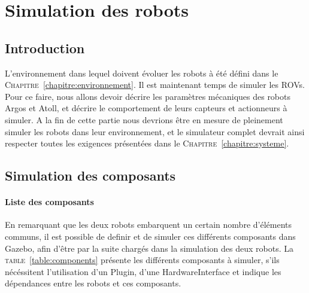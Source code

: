 \chapter{Simulation des robots}
\label{chapitre:robots}
	
	\section{Introduction}

		L'environnement dans lequel doivent évoluer les robots à été défini dans le \textsc{Chapitre}~\ref{chapitre:environnement}. Il est maintenant temps de simuler les \gls{ROV}s. Pour ce faire, nous allons devoir décrire les paramètres mécaniques des robots \gls{Argos} et \gls{Atoll}, et décrire le comportement de leurs capteurs et actionneurs à simuler. A la fin de cette partie nous devrions être en mesure de pleinement simuler les robots dans leur environnement, et le simulateur complet devrait ainsi respecter toutes les exigences présentées dans le \textsc{Chapitre}~\ref{chapitre:systeme}.

	\section{Simulation des composants}

		\subsubsection{Liste des composants}
			En remarquant que les deux robots embarquent un certain nombre d'éléments communs, il est possible de definir et de simuler ces différents composants dans \gls{Gazebo}, afin d'être par la suite chargés dans la simulation des deux robots. La \textsc{table}~\ref{table:components} présente les différents composants à simuler, s'ils nécéssitent l'utilisation d'un \gls{Plugin}, d'une \gls{HardwareInterface} et indique les dépendances entre les robots et ces composants.


